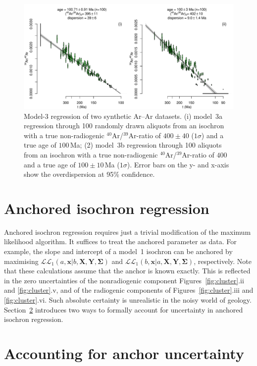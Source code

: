 \documentclass{article}
\begin{document}
\begin{figure}[!ht]
  \includegraphics[width=15cm]{fig2.pdf}
  \caption{Model-3 regression of two synthetic Ar--Ar datasets.  (i)
    model~3a regression through 100 randomly drawn aliquots from an
    isochron with a true non-radiogenic ${}^{40}$Ar/${}^{39}$Ar-ratio
    of $400\pm{40}$ ($1\sigma$) and a true age of $100$\,Ma; (2)
    model~3b regression through 100 aliquots from an isochron with a
    true non-radiogenic ${}^{40}$Ar/${}^{39}$Ar-ratio of $400$ and a
    true age of $100\pm{10}$\,Ma ($1\sigma$). Error bars on the y- and
    x-axis show the overdispersion at 95\% confidence.}
  \label{fig:ArAr}
\end{figure}

\section{Anchored isochron regression}\label{sec:anchor}

Anchored isochron regression requires just a trivial modification of
the maximum likelihood algorithm. It suffices to treat the anchored
parameter as data. For example, the slope and intercept of a model~1
isochron can be anchored by maximising
$\mathcal{LL}_1(a,\mathbf{x}|b,\mathbf{X},\mathbf{Y},\mathbf{\Sigma})$
and
$\mathcal{LL}_1(b,\mathbf{x}|a,\mathbf{X},\mathbf{Y},\mathbf{\Sigma})$,
respectively. Note that these calculations assume that the anchor is
known exactly. This is reflected in the zero uncertainties of the
nonradiogenic component Figures~\ref{fig:cluster}.ii and
\ref{fig:cluster}.v, and of the radiogenic components of
Figures~\ref{fig:cluster}.iii and \ref{fig:cluster}.vi. Such absolute
certainty is unrealistic in the noisy world of geology.
Section~\ref{sec:anchorerr} introduces two ways to formally account
for uncertainty in anchored isochron regression.

\section{Accounting for anchor uncertainty}\label{sec:anchorerr}
\end{document}
